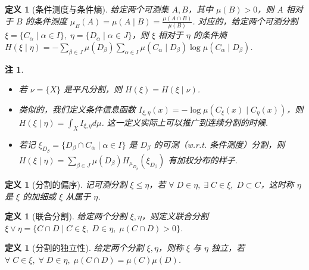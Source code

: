 \documentclass[11pt, a4paper, oneside]{ctexart}
\newtheorem{definition}[theorem]{定义}
\newtheorem{remark}[theorem]{注}
\begin{document}
    \begin{definition}[条件测度与条件熵]
        给定两个可测集 $A,B$，其中 $\mu(B)>0$，则 $A$ 相对于 $B$ 的条件测度 $\mu_B(A)=\mu(A\mid B)=\frac{\mu(A\cap B)}{\mu(B)}$. 对应的，给定两个可测分割 $\xi=\{C_{\alpha}\mid\alpha\in I\},\;\eta=\{D_{\alpha}\mid \alpha\in J\}$，则 $\xi$ 相对于 $\eta$ 的条件熵 $H(\xi\mid\eta)=-\sum\limits_{\beta\in J}\mu(D_{\beta})\sum\limits_{\alpha\in I}\mu(C_{\alpha}\mid D_{\beta})\log\mu(C_{\alpha}\mid D_{\beta})$.
    \end{definition}
    \begin{remark}
        \begin{itemize}
            \item 若 $\nu=\{X\}$ 是平凡分割，则 $H(\xi)=H(\xi\mid \nu)$.
            \item 类似的，我们定义条件信息函数 $I_{\xi,\eta}(x)=-\log\mu(C_{\xi}(x)\mid C_{\eta}(x))$，则 $H(\xi\mid\eta)=\int_{X}I_{\xi,\eta}d\mu$. 这一定义实际上可以推广到连续分割的时候.
            \item 若记 $\xi_{D_{\beta}}=\{D_{\beta}\cap C_{\alpha}\mid\alpha\in I\}$ 是 $D_{\beta}$ 的可测（w.r.t. 条件测度）分割，则 $H(\xi\mid\eta)=\sum\limits_{\beta\in J}\mu(D_{\beta})H_{\mu_{D_{\beta}}}(\xi_{D_{\beta}})$ 有加权分布的样子.
        \end{itemize}
    \end{remark}

    \begin{definition}[分割的偏序]
        记可测分割 $\xi\leq\eta$，若 $\forall\; D\in \eta,\;\exists\; C\in\xi,\; D\subset C$，这时称 $\eta$ 是 $\xi$ 的加细或 $\xi$ 从属于 $\eta$.
    \end{definition}
    \begin{definition}[联合分割]
        给定两个分割 $\xi,\eta$，则定义联合分割 $\xi\vee\eta=\{C\cap D\mid C\in\xi,\; D\in\eta,\;\mu(C\cap D)>0\}$.
    \end{definition}
    \begin{definition}[分割的独立性]
        给定两个分割 $\xi,\eta$，则称 $\xi$ 与 $\eta$ 独立，若 $\forall\; C\in \xi,\;\forall\; D\in \eta,\; \mu(C\cap D)=\mu(C)\mu(D)$.
    \end{definition}
    
\end{document}
